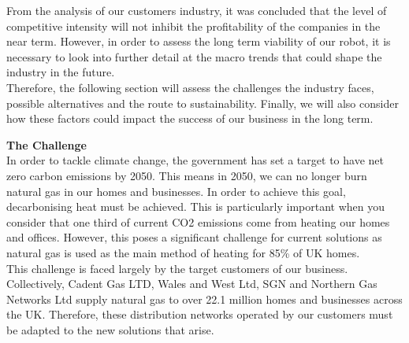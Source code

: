 \documentclass[11pt]{article}		%
\begin{document}
    		From the analysis of our customers industry, it was concluded that the level of competitive intensity will not inhibit the profitability of the companies in the near term. However, in order to assess the long term viability of our robot, it is necessary to look into further detail at the macro trends that could shape the industry in the future.\\
    	    \hspace*{3ex}Therefore, the following section will assess the challenges the industry faces, possible alternatives and the route to sustainability. Finally, we will also consider how these factors could impact the success of our business in the long term. 
    	    
    	    \textbf{The Challenge}\\
            In order to tackle climate change, the government has set a target to have net zero carbon emissions by 2050. This means in 2050, we can no longer burn natural gas in our homes and businesses. In order to achieve this goal, decarbonising heat must be achieved. This is particularly important when you consider that one third of current CO2 emissions come from heating our homes and offices. However, this poses a significant challenge for current solutions as natural gas is used as the main method of heating for 85\% of UK homes.\\
            \hspace*{3ex}This challenge is faced largely by the target customers of our business. Collectively, Cadent Gas LTD, Wales and West Ltd, SGN and Northern Gas Networks Ltd supply natural gas to over 22.1 million homes and businesses across the UK. Therefore, these distribution networks operated by our customers must be adapted to the new solutions that arise. 
    
\end{document}

